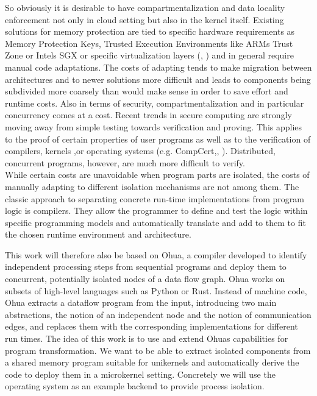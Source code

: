 So obviously it is desirable to have compartmentalization and data locality enforcement not only in cloud setting but also in the kernel itself. Existing solutions for memory protection are tied to specific hardware requirements as Memory Protection Keys, Trusted Execution Environments like ARMs Trust Zone\cite{pinto2019demystifying} or Intels SGX \cite{costan2016intel} or specific virtualization layers (\cite{tan2007ikernel}, \cite{nikolaev2013virtuos}) and in general require manual code adaptations. The costs of adapting tends to make migration between architectures and to newer solutions more difficult and leads to components being subdivided more coarsely than would make sense in order to save effort and runtime costs. Also in terms of security, compartmentalization and in particular concurrency comes at a cost. Recent trends in secure computing are strongly moving away from simple testing towards verification and proving. This applies to the proof of certain properties of user programs as well as to the verification of compilers, kernels ,or operating systems (e.g. CompCert\cite{leroy2009formal},\cite{sL4Verf}, \cite{gu2016certikos}). Distributed, concurrent programs, however, are much more difficult to verify. \\

While certain costs are unavoidable when program parts are isolated, the costs of manually adapting to different isolation mechanisms are not among them. The classic approach to separating concrete run-time implementations from program logic is compilers. They allow the programmer to define and test the logic within specific programming models and automatically translate and add to them to fit the chosen runtime environment and architecture. 

This work will therefore also be based on Ohua\cite{ertel2015ohua}, a compiler developed to identify independent processing steps from sequential programs and deploy them to concurrent, potentially isolated nodes of a data flow graph. Ohua works on subsets of high-level languages such as Python or Rust. Instead of machine code, Ohua extracts a dataflow program from the input, introducing two main abstractions, the notion of an independent node and the notion of communication edges, and replaces them with the corresponding implementations for different run times. The idea of this work is to use and extend Ohuas capabilities for program transformation. We want to be able to extract isolated components from a shared memory program suitable for unikernels and automatically derive the code to deploy them in a microkernel setting. Concretely we will use the \md operating system as an example backend to provide process isolation. 

